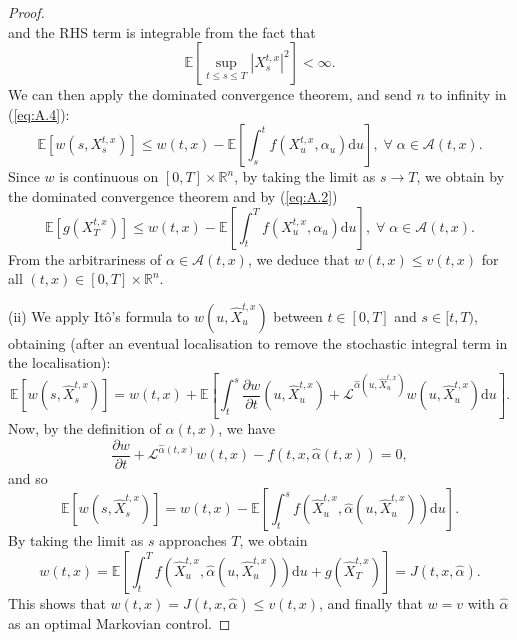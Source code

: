\begin{proof}
\begin{equation*}
    \end{equation*}
    and the RHS term is integrable from the fact that 
    \begin{equation*}
        \mathbb{E}\left[\sup_{t\leq s\leq T}|X_s^{t,x}|^2\right]<\infty.
    \end{equation*}
    We can then apply the dominated convergence theorem, and send $n$ to infinity
    in (\ref{eq:A.4}):
    \begin{equation*}
        \mathbb{E}[w(s,X_s^{t,x})]\leq w(t,x)-\mathbb{E}\left[\int_s^tf(X_u^{t,x},\alpha_u)\mathrm du\right],\;\forall\;\alpha\in\mathcal{A}(t,x).
    \end{equation*}
    Since $w$ is continuous on $[0,T]\times\mathbb{R}^n$, by taking the limit as $s
    \rightarrow T$,
    we obtain by the dominated convergence theorem and by (\ref{eq:A.2})
    \begin{equation*}
        \mathbb{E}[g(X_T^{t,x})]\leq w(t,x)-\mathbb{E}\left[\int_t^Tf(X_u^{t,x},\alpha_u)\mathrm du\right],\;\forall\;\alpha\in\mathcal{A}(t,x).
    \end{equation*}
    From the arbitrariness of $\alpha\in\mathcal{A}(t,x)$, we deduce that $w(t,x)
    \leq v(t,x)$ for all $(t,x)\in[0,T]\times\mathbb{R}^n.$

    (ii) We apply It\^{o}'s formula to $w(u,\hat{X}_u^{t,x})$ between $t\in[0,T]$ 
    and $s\in[t,T)$, obtaining (after an eventual localisation to remove the stochastic 
    integral term in the localisation):
    \begin{equation*}
        \mathbb{E}[w(s,\hat{X}_s^{t,x})]=w(t,x)+\mathbb{E}\left[\int_t^s\frac{\partial w}{\partial t}(u,\hat{X}_u^{t,x})+\mathcal{L}^{\hat\alpha(u,\hat{X}_u^{t,x})}w(u,\hat{X}_u^{t,x})\mathrm du\right].
    \end{equation*}
    Now, by the definition of $\hat\alpha(t,x)$, we have 
    \begin{equation*}
        \frac{\partial w}{\partial t}+\mathcal{L}^{\hat\alpha(t,x)}w(t,x)-f(t,x,\hat\alpha(t,x))=0,
    \end{equation*}
    and so 
    \begin{equation*}
        \mathbb{E}[w(s,\hat{X}_s^{t,x})]=w(t,x)-\mathbb{E}\left[\int_t^sf(\hat{X}_u^{t,x},\hat{\alpha}(u,\hat{X}_u^{t,x}))\mathrm du\right].
    \end{equation*}
    By taking the limit as $s$ approaches $T$, we obtain
    \begin{equation*}
        w(t,x)=\mathbb{E}\left[\int_t^Tf(\hat{X}_u^{t,x},\hat\alpha(u,\hat{X}_u^{t,x}))\mathrm du+g(\hat{X}_T^{t,x})\right]=J(t,x,\hat{\alpha}).
    \end{equation*}
    This shows that $w(t,x)=J(t,x,\hat\alpha)\leq v(t,x)$, and finally that $w=v$
    with $\hat\alpha$ as an optimal Markovian control.
\end{proof}